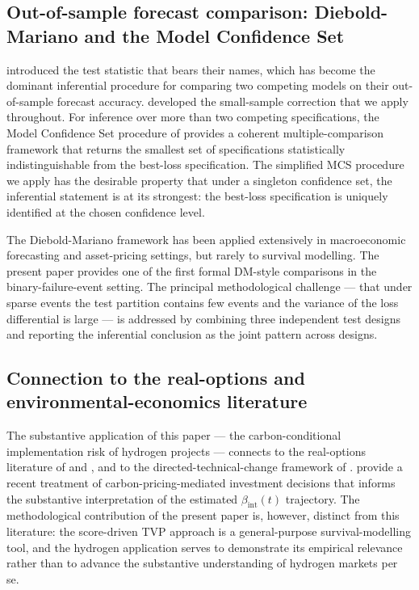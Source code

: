 \documentclass[12pt,a4paper]{article}
\newcommand{\bint}{\beta_{\text{int}}}
\theoremstyle{plain}
\theoremstyle{definition}
\begin{document}
\subsection{Out-of-sample forecast comparison: Diebold-Mariano and the Model Confidence Set}

\cite{diebold1995comparing} introduced the test statistic that bears their names, which has become the dominant inferential procedure for comparing two competing models on their out-of-sample forecast accuracy. \cite{harvey1997testing} developed the small-sample correction that we apply throughout. For inference over more than two competing specifications, the Model Confidence Set procedure of \cite{hansen2011model} provides a coherent multiple-comparison framework that returns the smallest set of specifications statistically indistinguishable from the best-loss specification. The simplified MCS procedure we apply has the desirable property that under a singleton confidence set, the inferential statement is at its strongest: the best-loss specification is uniquely identified at the chosen confidence level.

The Diebold-Mariano framework has been applied extensively in macroeconomic forecasting and asset-pricing settings, but rarely to survival modelling. The present paper provides one of the first formal DM-style comparisons in the binary-failure-event setting. The principal methodological challenge --- that under sparse events the test partition contains few events and the variance of the loss differential is large --- is addressed by combining three independent test designs and reporting the inferential conclusion as the joint pattern across designs.

\subsection{Connection to the real-options and environmental-economics literature}

The substantive application of this paper --- the carbon-conditional implementation risk of hydrogen projects --- connects to the real-options literature of \cite{dixit1994investment} and \cite{pindyck1991irreversibility}, and to the directed-technical-change framework of \cite{acemoglu2012environment}. \cite{bolton2021carbon} provide a recent treatment of carbon-pricing-mediated investment decisions that informs the substantive interpretation of the estimated $\bint(t)$ trajectory. The methodological contribution of the present paper is, however, distinct from this literature: the score-driven TVP approach is a general-purpose survival-modelling tool, and the hydrogen application serves to demonstrate its empirical relevance rather than to advance the substantive understanding of hydrogen markets per se.
\end{document}
